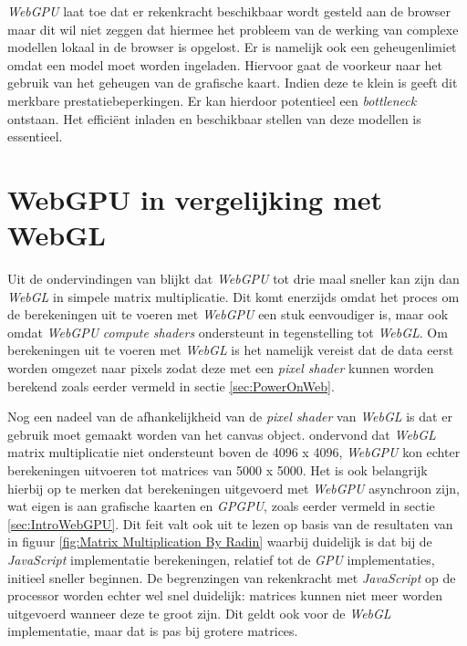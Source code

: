 \bigbreak{}

\textit{WebGPU} laat toe dat er rekenkracht beschikbaar wordt gesteld aan de browser maar dit wil niet zeggen dat hiermee het probleem van de werking van complexe modellen lokaal in de browser is opgelost. Er is namelijk ook een geheugenlimiet omdat een model moet worden ingeladen. Hiervoor gaat de voorkeur naar het gebruik van het geheugen van de grafische kaart. Indien deze te klein is geeft dit merkbare prestatiebeperkingen. Er kan hierdoor potentieel een \textit{bottleneck} ontstaan. Het efficiënt inladen en beschikbaar stellen van deze modellen is essentieel.

\section{WebGPU in vergelijking met WebGL}

Uit de ondervindingen van \textcite{Radin2021} blijkt dat \textit{WebGPU} tot drie maal sneller kan zijn dan \textit{WebGL} in simpele matrix multiplicatie. Dit komt enerzijds omdat het proces om de berekeningen uit te voeren met \textit{WebGPU} een stuk eenvoudiger is, maar ook omdat \textit{WebGPU} \textit{compute shaders} ondersteunt in tegenstelling tot \textit{WebGL}. Om berekeningen uit te voeren met \textit{WebGL} is het namelijk vereist dat de data eerst worden omgezet naar pixels zodat deze met een \textit{pixel shader} kunnen worden berekend zoals eerder vermeld in sectie \ref{sec:PowerOnWeb}. 

\bigbreak{}

Nog een nadeel van de afhankelijkheid van de \textit{pixel shader} van \textit{WebGL} is dat er gebruik moet gemaakt worden van het canvas object. \textcite{Radin2021} ondervond dat \textit{WebGL} matrix multiplicatie niet ondersteunt boven de 4096 x 4096, \textit{WebGPU} kon echter berekeningen uitvoeren tot matrices van 5000 x 5000. Het is ook belangrijk hierbij op te merken dat berekeningen uitgevoerd met \textit{WebGPU} asynchroon zijn, wat eigen is aan grafische kaarten en \textit{GPGPU}, zoals eerder vermeld in sectie \ref{sec:IntroWebGPU}. Dit feit valt ook uit te lezen op basis van de resultaten van \textcite{Radin2021} in figuur \ref{fig:Matrix Multiplication By Radin} waarbij duidelijk is dat bij de \textit{JavaScript} implementatie berekeningen, relatief tot de \textit{GPU} implementaties, initieel sneller beginnen. De begrenzingen van rekenkracht met \textit{JavaScript} op de processor worden echter wel snel duidelijk: matrices kunnen niet meer worden uitgevoerd wanneer deze te groot zijn. Dit geldt ook voor de \textit{WebGL} implementatie, maar dat is pas bij grotere matrices.

